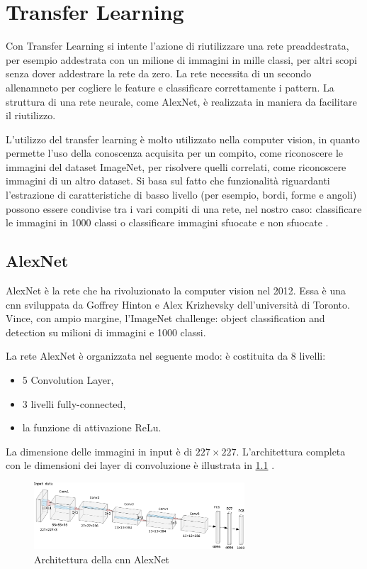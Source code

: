 \chapter{Transfer Learning}\label{transfer-learning}

Con Transfer Learning si intente l'azione di riutilizzare una rete preaddestrata, per esempio addestrata con un milione di immagini in mille classi, per altri scopi senza dover addestrare la rete da zero. La rete necessita di un secondo allenamneto per cogliere le feature e classificare correttamente i pattern. La struttura di una rete neurale, come AlexNet, è realizzata in maniera da facilitare il riutilizzo. 

L'utilizzo del transfer learning è molto utilizzato nella computer vision, in quanto permette l'uso della conoscenza acquisita per un
compito, come riconoscere le immagini del dataset ImageNet, per risolvere quelli correlati, come riconoscere immagini di un altro dataset. Si basa sul fatto che
funzionalità riguardanti l'estrazione di caratteristiche di basso livello
(per esempio, bordi, forme e angoli) possono essere condivise tra i vari compiti di una rete, nel nostro caso: classificare le immagini in 1000 classi o classificare immagini sfuocate e non sfuocate \cite{patrini_tl}.

\section{AlexNet}\label{alexnet}
AlexNet è la rete che ha rivoluzionato la computer vision nel 2012. Essa è una \gls{cnn} sviluppata
da Goffrey Hinton e Alex Krizhevsky dell’università di Toronto. Vince, con ampio margine, 
l’ImageNet challenge: object classification and detection su milioni di immagini e 1000 classi.

La rete AlexNet è organizzata nel seguente modo: è costituita da 8 livelli:
\begin{itemize}
    \item 5 \gls{Convolution Layer},
    \item 3 livelli \gls{fully-connected},
    \item la funzione di attivazione \gls{ReLu}.
\end{itemize}
La dimensione delle immagini in input è di \(227\times 227\). L'architettura completa con le dimensioni dei layer di \gls{convoluzione} è illustrata in \cref{fig:alexnet} \cite{alexnet}.  

\begin{figure}[ht]
    \centering
    \includegraphics[width=0.7\textwidth]{addestramento-rete-neurale/alexnet.pdf}
    \caption{Architettura della \gls{cnn} AlexNet}
    \label{fig:alexnet}
\end{figure}

